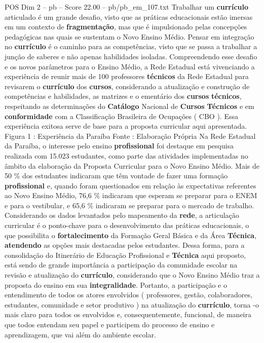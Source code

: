 \begin{textsample}{POS Dim 2 – pb – Score 22.00 – pb/pb\_em\_107.txt}
Trabalhar um \textbf{currículo} articulado é um grande desafio, visto que as práticas educacionais estão imersas em um contexto de \textbf{fragmentação}, mas que é impulsionado pelas concepções pedagógicas nas quais se sustentam o Novo Ensino Médio.
Pensar em integração no \textbf{currículo} é o caminho para as competências, visto que se passa a trabalhar a junção de saberes e não apenas habilidades isoladas.
Compreendendo esse desafio e os novos parâmetros para o Ensino Médio, a Rede Estadual está vivenciando a experiência de reunir mais de 100 professores \textbf{técnicos} da Rede Estadual para revisarem o \textbf{currículo} dos \textbf{cursos}, considerando a atualização e construção de competências e habilidades, as matrizes e o ementário dos \textbf{cursos} \textbf{técnicos}, respeitando as determinações do \textbf{Catálogo} Nacional de \textbf{Cursos} \textbf{Técnicos} e em \textbf{conformidade} com a Classificação Brasileira de Ocupações ( CBO ).
Essa experiência exitosa serve de base para a proposta curricular aqui apresentada.
Figura 1 : Experiência da Paraíba Fonte : Elaboração Própria Na Rede Estadual da Paraíba, o interesse pelo ensino \textbf{profissional} foi destaque em pesquisa realizada com 15.023 estudantes, como parte das atividades implementadas no âmbito da elaboração da Proposta Curricular para o Novo Ensino Médio.
Mais de 50 \% dos estudantes indicaram que têm vontade de fazer uma formação \textbf{profissional} e, quando foram questionados em relação às expectativas referentes ao Novo Ensino Médio, 76,6 \% indicaram que esperam se preparar para o ENEM e para o vestibular, e 65,6 \% indicaram se preparar para o mercado de trabalho.
Considerando os dados levantados pelo mapeamento da \textbf{rede}, a articulação curricular é o ponto-chave para o desenvolvimento das práticas educacionais, o que possibilita o \textbf{fortalecimento} da Formação Geral Básica e da Área \textbf{Técnica}, \textbf{atendendo} as opções mais destacadas pelos estudantes.
Dessa forma, para a consolidação do Itinerário de Educação Profissional e \textbf{Técnica} aqui proposto, está sendo de grande importância a participação da comunidade escolar na revisão e atualização do \textbf{currículo}, considerando que o Novo Ensino Médio traz a proposta do ensino em sua \textbf{integralidade}.
Portanto, a participação e o entendimento de todos os atores envolvidos ( professores, gestão, colaboradores, estudantes, comunidade e setor produtivo ) na atualização do \textbf{currículo}, torna -o mais claro para todos os envolvidos e, consequentemente, funcional, de maneira que todos entendam seu papel e participem do processo de ensino e aprendizagem, que vai além do ambiente escolar.

\end{textsample}
